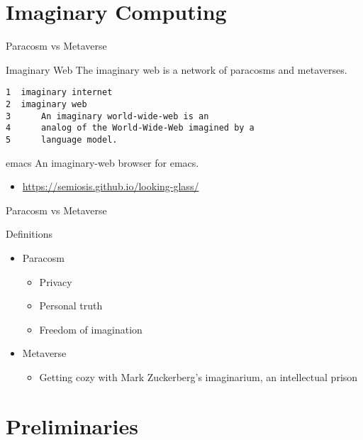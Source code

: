 \documentclass[presentation]{beamer}
\begin{document}
\section{Imaginary Computing}
\label{sec:orgdcba28b}
\begin{frame}[label={sec:org144af45},fragile]{Paracosm vs Metaverse}
 \begin{block}{Imaginary Web}
The imaginary web is a network of paracosms
and metaverses.

\begin{verbatim}
1  imaginary internet
2  imaginary web
3      An imaginary world-wide-web is an
4      analog of the World-Wide-Web imagined by a
5      language model.
\end{verbatim}
\end{block}

\begin{block}{emacs}
An imaginary-web browser for emacs.

\begin{itemize}
\item \url{https://semiosis.github.io/looking-glass/}
\end{itemize}
\end{block}
\end{frame}

\begin{frame}[label={sec:org6af0428}]{Paracosm vs Metaverse}
\begin{block}{Definitions}
\begin{itemize}
\item Paracosm
\begin{itemize}
\item Privacy
\item Personal truth
\item Freedom of imagination
\end{itemize}
\item Metaverse
\begin{itemize}
\item Getting cozy with Mark Zuckerberg's imaginarium, an intellectual prison
\end{itemize}
\end{itemize}
\end{block}
\end{frame}

\section{Preliminaries}
\label{sec:org63aaa99}
\end{document}
